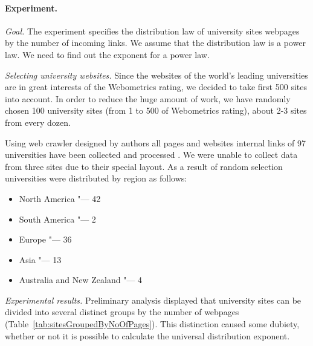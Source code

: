 \paragraph{Experiment.} \textit{Goal.} The experiment specifies the distribution law of university sites webpages by the number of incoming links. We assume that the distribution law is a power law. We need to find out the exponent for a power law.

\textit{Selecting university websites.} Since the websites of the world's leading universities are in great interests of the Webometrics rating, we decided to take first 500 sites into account. In order to reduce the huge amount of work, we have randomly chosen 100 university sites (from 1 to 500 of Webometrics rating), about 2-3 sites from every dozen.

Using web crawler designed by authors all pages and websites internal links of 97 universities have been collected and processed \cite{WebometricsLab}. We were unable to collect data from three sites due to their special layout. As a result of random selection universities were distributed by region as follows:
\begin{itemize}
	\item North America "--- 42
	\item South America "--- 2
	\item Europe "--- 36
	\item Asia "--- 13
	\item Australia and New Zealand "--- 4
\end{itemize}

\textit{Experimental results.} Preliminary analysis displayed that university sites can be divided into several distinct groups by the number of webpages (Table~\cref{tab:sitesGroupedByNoOfPages}). This distinction caused some dubiety, whether or not it is possible to calculate the universal distribution exponent. 

